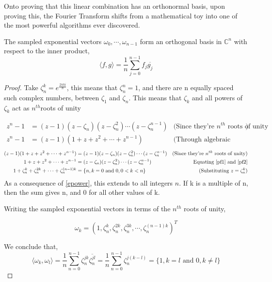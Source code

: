 \documentclass[twoside]{article}
\begin{document}
Onto proving that this linear combination has an orthonormal basis, upon proving this, the Fourier Transform shifts from a mathematical toy into one of the most powerful algorithms ever discovered.
\pagebreak
\begin{theorem}
	The sampled exponential vectors $\omega_0, \cdots , \omega_{n-1}$ form an orthogonal basis in $\mathbb{C}^n$ with respect to the inner product,
	\[
		\langle f,g \rangle = \frac{1}{n} \sum_{j=0}^{n-1} f_j \overline{g_j}
	\]
\end{theorem}
\begin{proof}
Take $\zeta_n^k = e^{\frac{2\pi k i}{n}}$, this means that $\zeta^n_n = 1$, and there are n equally spaced such complex numbers, between $\zeta_1$ and $\zeta_n$. This means that $\zeta_k$ and all powers of $\zeta_k$ act as $n^{th} $roots of unity

	\begin{align}
		z^{n}-1 &= (z-1)(z -  \zeta_n)(z-\zeta_n^2)\cdots(z - \zeta_n^{n-1}) &\text{(Since they're $n^{th}$ roots of unity})  \label{pf1} \\
		z^n-1 &= (z-1)(1 + z + z^2 + \cdots + z^{n-1}) &\text{(Through algebraic factorization)} \label{pf2}
	\end{align}
	\begin{align*}
	(z-1)(1 + z + z^2 + \cdots + z^{n-1})  &= (z-1)(z -  \zeta_n)(z-\zeta_n^2)\cdots(z - \zeta_n^{n-1}) &\text{(Since they're $n^{th}$ roots of unity}) \\
	1 + z + z^2 + \cdots + z^{n-1}  &= (z -  \zeta_n)(z-\zeta_n^2)\cdots(z - \zeta_n^{n-1}) &\text{Equating \ref{pf1} and \ref{pf2}}\\
		1 + \zeta_n^k + \zeta_n^{2k} + \cdots + \zeta_n^{(n-1) k} &= \{n,k = 0 \text{ and } 0, 0 < k < n \} &\text{(Substituting $z = \zeta_n^k$)} \\
	\end{align*}
As a consequence of \ref{epower}, this extends to all integers $n$. If k is a multiple of n, then the sum gives n, and 0 for all other values of k.

Writing the sampled exponential vectors in terms of the $n^{th}$ roots of unity,

\[
	\omega_k = (1, \zeta_n^k, \zeta_n^{2k},\zeta_n^{3k}, \cdots, \zeta_n^{(n-1)k})^T
\]

We conclude that, 
\[
	\langle	\omega_k, \omega_l \rangle = \frac{1}{n} \sum_{n=0}^{n-1} \zeta_{n}^{jk} \overline{\zeta_{n}^{jl}} = \frac{1}{n} \sum_{n=0}^{n-1} \zeta_n^{j(k-l)} = \{1, k = l \text{ and } 0, k \neq l\}
\]
\end{proof}
\end{document}
